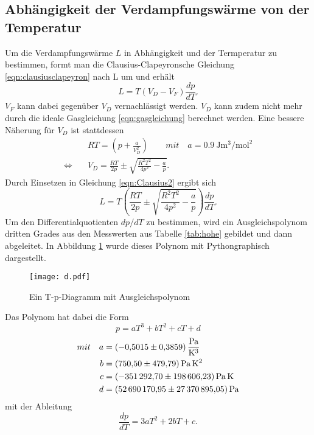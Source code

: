 \subsection{Abhängigkeit der Verdampfungswärme von der Temperatur}
Um die Verdampfungswärme $L$ in Abhängigkeit und der Termperatur zu bestimmen, formt man die
Clausius-Clapeyronsche Gleichung \eqref{eqn:clausiusclapeyron} nach L um und erhält
\begin{equation}
  L=T(V_D-V_F)\frac{dp}{dT}. \label{eqn:Clausius2}
\end{equation}
$V_F$ kann dabei gegenüber $V_D$ vernachlässigt werden. $V_D$ kann zudem nicht mehr durch die
ideale Gasgleichung \eqref{eqn:gasgleichung} berechnet werden. Eine bessere Näherung für $V_D$
ist stattdessen 
\begin{align}
  &RT=\left(p+\frac{a}{V_D^2}\right) \qquad mit \quad a=\SI{0.9}{\joule\cubic\metre\per\square\mole}\\
  \Leftrightarrow \quad &V_D=\frac{RT}{2p}\pm\sqrt{\frac{R^2T^2}{4p^2}-\frac{a}{p}}. \label{eqn:Vd}
\end{align}
Durch Einsetzen in Gleichung \eqref{eqn:Clausius2} ergibt sich
\begin{equation}
  L=T\left(\frac{RT}{2p}\pm\sqrt{\frac{R^2T^2}{4p^2}-\frac{a}{p}}\right)\frac{dp}{dT}. \label{eqn:Clausius3}
\end{equation}
Um den Differentialquotienten $dp/dT$ zu bestimmen, wird ein Ausgleichspolynom dritten Grades
aus den Messwerten aus Tabelle \ref{tab:hohe} gebildet und dann abgeleitet. In Abbildung
\ref{fig:Polynom} wurde dieses Polynom mit Pythongraphisch dargestellt.
\begin{figure}
  \centering
  \texttt{[image: d.pdf]}
  \caption{Ein T-p-Diagramm mit Ausgleichspolynom}
  \label{fig:Polynom}
\end{figure}
Das Polynom hat dabei die Form
\begin{equation}
  p=aT^3+bT^2+cT+d
\end{equation}
\begin{align}
  mit \quad a &= \SI{-0.5015\pm0.3859}{\pascal\per\cubic\kelvin}\\
      b &= \SI{750.50\pm479.79}{\pascal\square\kelvin}\\
      c &= \SI{-351292.70\pm198606.23}{\pascal\kelvin}\\
      d &= \SI{52690170.95\pm27370895.05}{\pascal}
\end{align}
mit der Ableitung
\begin{equation}
  \frac{dp}{dT}=3aT^2+2bT+c.
\end{equation}
